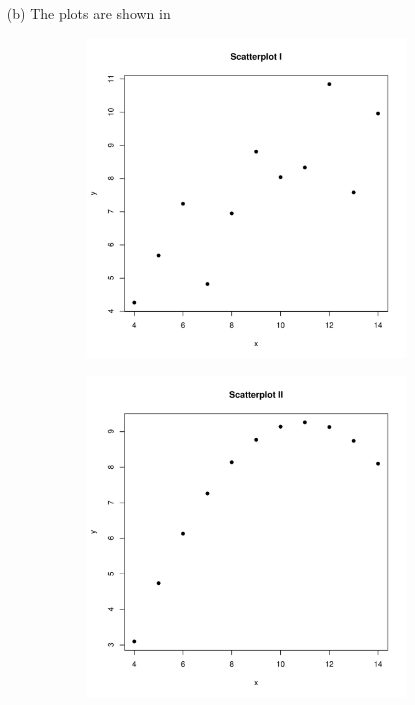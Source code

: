 \documentclass[a4paper]{article}
\begin{document}
\begin{enumerate}
	
	\item[(b)] The plots are shown in  \\
	\begin{figure}[!ht]
		\centering
		\begin{subfigure}{.35\textwidth}
			\includegraphics[width=\linewidth]{ScatterplotI.pdf}
		\end{subfigure}		
		\begin{subfigure}{.35\textwidth}
			\includegraphics[width=\linewidth]{ScatterplotII.pdf}

\end{subfigure}
\end{figure}
\end{enumerate}
\end{document}

